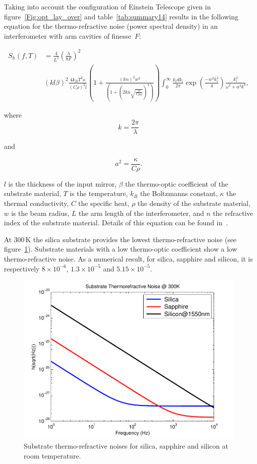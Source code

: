 Taking into account the configuration of Einstein Telescope given in figure~\ref{Fig:opt_lay_over} and table~\ref{tab:summary14} results in the following equation for the thermo-refractive noise (power spectral density) in an interferometer with arm cavities of finesse~$F$:

\begin{align}
S_h(f,T)&=\frac{4}{L^2}\left(\frac{\lambda}{8F}\right)^2 \nonumber \\
&\left(kl \beta\right)^{2} \frac{4k_B T^{2} \kappa}{\left(C\rho\right)^{2}l}
\left(1+\frac{\left(kn\right)^{2}w^{2}}{\left(1+\left(2kn\sqrt{\frac{\kappa}{C
\rho\omega}}\right)^{4}\right)}\right) \int_0^{\infty}{\frac{k_i dk_i}{2\pi} \exp \left(\frac{-w^2k_{i}^{2}}{4}\right) \frac{k_{i}^2}{\omega^2+a^4 k^4 }}, 
\label{eq:Tref}
\end{align}

where
\begin{equation}
k=\frac{2 \pi}{\lambda}
\label{eq:k}
\end{equation}

and 

\begin{equation}
{a}^2=\frac{\kappa}{C\rho}.
\end{equation}

$l$ is the thickness of the input mirror, $\beta$ the thermo-optic coefficient of the substrate material, $T$ is the temperature, $k_B$ the Boltzmanns constant, $\kappa$ the thermal conductivity, $C$ the specific heat, $\rho$ the density of the substrate material, $w$ is the beam radius, $L$ the arm length of the interferometer, and $n$ the refractive index of the substrate material. Details of this equation can be found in~\cite{Franc2010}.

At 300\,K the silica substrate provides the lowest thermo-refractive noise (see figure~\ref{fig:Bulk_Tref_300K}). Substrate materials with a low thermo-optic coefficient show a low thermo-refractive noise. As a numerical result, for silica, sapphire and silicon, it is respectively $8\times10^{-6}$, $1.3\times10^{-5}$ and $5.15\times10^{-5}$. 

\begin{figure}[!h]
\begin{center}
\includegraphics[width=0.49\linewidth]{Sec_Optics/Bulk_Tref_comp_300K.pdf}
\caption{Substrate thermo-refractive noises for silica, sapphire and silicon at room temperature.}
\label{fig:Bulk_Tref_300K}
\end{center}
\end{figure}

